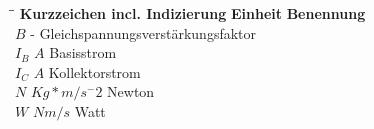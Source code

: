 
\begin{tabbing}
\hspace{7cm} \= \hspace{3cm}\= \kill
\textbf{Kurzzeichen incl. Indizierung} \> \textbf{Einheit} \> \textbf{Benennung} \\
$B$ \> - \> Gleichspannungsverstärkungsfaktor \\
$I_B$ \> $A$ \> Basisstrom \\
$I_C$ \> $A$ \> Kollektorstrom \\
$N$ \> $Kg*m/s^-2$ \> Newton \\
$W$ \> $Nm/s$ \> Watt \\
\end{tabbing}

\clearpage
